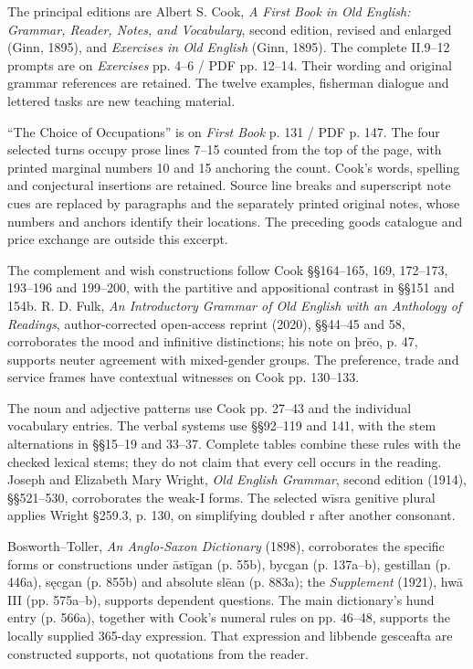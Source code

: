 \begingroup\fontsize{10}{12.8}\selectfont
\setlength{\parskip}{1.5pt}
The principal editions are Albert S. Cook, \emph{A First Book in Old English: Grammar, Reader, Notes, and Vocabulary}, second edition, revised and enlarged (Ginn, 1895), and \emph{Exercises in Old English} (Ginn, 1895). The complete II.9–12 prompts are on \emph{Exercises} pp. 4–6 /\allowbreak{} PDF pp. 12–14. Their wording and original grammar references are retained. The twelve examples, fisherman dialogue and lettered tasks are new teaching material.

“The Choice of Occupations” is on \emph{First Book} p. 131 /\allowbreak{} PDF p. 147. The four selected turns occupy prose lines 7–15 counted from the top of the page, with printed marginal numbers 10 and 15 anchoring the count. Cook’s words, spelling and conjectural insertions are retained. Source line breaks and superscript note cues are replaced by paragraphs and the separately printed original notes, whose numbers and anchors identify their locations. The preceding goods catalogue and price exchange are outside this excerpt.

The complement and wish constructions follow Cook §§164–165, 169, 172–173, 193–196 and 199–200, with the partitive and appositional contrast in §§151 and 154b. R. D. Fulk, \emph{An Introductory Grammar of Old English with an Anthology of Readings}, author-corrected open-access reprint (2020), §§44–45 and 58, corroborates the mood and infinitive distinctions; his note on þrēo, p. 47, supports neuter agreement with mixed-gender groups. The preference, trade and service frames have contextual witnesses on Cook pp. 130–133.

The noun and adjective patterns use Cook pp. 27–43 and the individual vocabulary entries. The verbal systems use §§92–119 and 141, with the stem alternations in §§15–19 and 33–37. Complete tables combine these rules with the checked lexical stems; they do not claim that every cell occurs in the reading. Joseph and Elizabeth Mary Wright, \emph{Old English Grammar}, second edition (1914), §§521–530, corroborates the weak-I forms. The selected wīsra genitive plural applies Wright §259.3, p. 130, on simplifying doubled r after another consonant.

Bosworth–Toller, \emph{An Anglo-Saxon Dictionary} (1898), corroborates the specific forms or constructions under āstīgan (p. 55b), bycgan (p. 137a–b), gestillan (p. 446a), sęcgan (p. 855b) and absolute slēan (p. 883a); the \emph{Supplement} (1921), hwā III (pp. 575a–b), supports dependent questions. The main dictionary’s hund entry (p. 566a), together with Cook’s numeral rules on pp. 46–48, supports the locally supplied 365-day expression. That expression and libbende gesceafta are constructed supports, not quotations from the reader.

